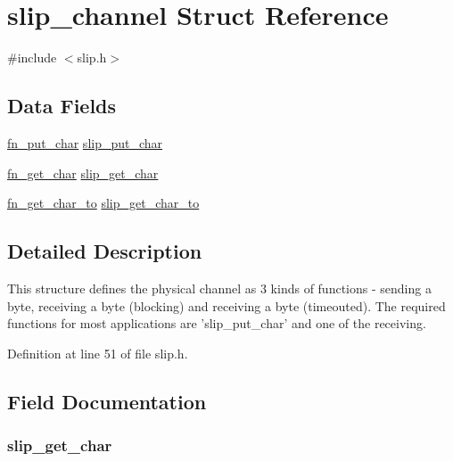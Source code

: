 \hypertarget{structslip__channel}{\section{slip\-\_\-channel Struct Reference}
\label{structslip__channel}
}


{\ttfamily \#include $<$slip.\-h$>$}

\subsection*{Data Fields}
\begin{DoxyCompactItemize}
\item 
\hyperlink{spec__types_8h_a37f4bf12d02c5a8034ea7842fc44139e}{fn\-\_\-put\-\_\-char} \hyperlink{structslip__channel_aa55cda0bc53118e4d95ae9667d08cf65}{slip\-\_\-put\-\_\-char}
\item 
\hyperlink{spec__types_8h_ae27f995dac682449dbaccadf5e5f8f2f}{fn\-\_\-get\-\_\-char} \hyperlink{structslip__channel_aa20c484f29bf3d3ab7b1d725acd1d47b}{slip\-\_\-get\-\_\-char}
\item 
\hyperlink{spec__types_8h_ace37bdc988d620cf5545d6be5c8df9a6}{fn\-\_\-get\-\_\-char\-\_\-to} \hyperlink{structslip__channel_a093b3751c0feac8a108cc2436939f03d}{slip\-\_\-get\-\_\-char\-\_\-to}
\end{DoxyCompactItemize}


\subsection{Detailed Description}
This structure defines the physical channel as 3 kinds of functions -\/ sending a byte, receiving a byte (blocking) and receiving a byte (timeouted). The required functions for most applications are 'slip\-\_\-put\-\_\-char' and one of the receiving. 

Definition at line 51 of file slip.\-h.



\subsection{Field Documentation}
\hypertarget{structslip__channel_aa20c484f29bf3d3ab7b1d725acd1d47b}{
\subsubsection[{slip\-\_\-get\-\_\-char}]{ slip\-\_\-get\-\_\-char}}\label{structslip__channel_aa20c484f29bf3d3ab7b1d725acd1d47b}


